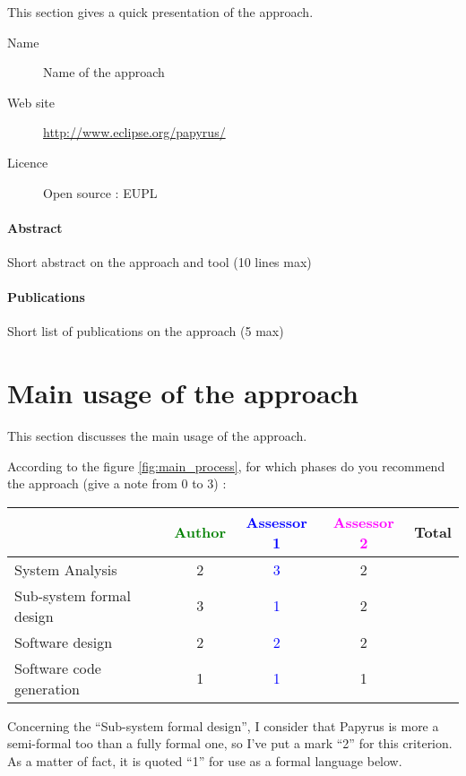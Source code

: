 This section gives a quick presentation of the approach.

\begin{description}
\item[Name] Name of the approach
\item[Web site] \url{http://www.eclipse.org/papyrus/}
\item[Licence] Open source : EUPL
\end{description}

\paragraph{Abstract} Short abstract on the approach and tool (10 lines max)

\paragraph{Publications} Short list of publications on the approach (5 max)


\section{Main usage of the approach}
\label{main_usage}
This section discusses the main usage of the approach.

According to the figure \ref{fig:main_process}, for which phases do you recommend the approach (give a note from 0 to 3) :

\begin{tabular}{|l | c | c | c | c|}
\hline
& \textcolor{green}{Author} & \textcolor{blue}{Assessor 1} & \textcolor{magenta}{Assessor 2} & Total \\
\hline
System Analysis & 2 & \textcolor{blue}{3} & 2 & \\
\hline
Sub-system formal design & 3 & \textcolor{blue}{1} & 2 & \\
\hline
Software design & 2 & \textcolor{blue}{2} & 2 & \\
\hline
Software code generation & 1 & \textcolor{blue}{1} & 1 & \\
\hline
\end{tabular}

\begin{assessor1}
Concerning the "`Sub-system formal design"', I consider that Papyrus is more a semi-formal too than a fully formal one, so I've put a mark "`2"' for this criterion. 
As a matter of fact, it is quoted "`1"' for use as a formal language below. 
\end{assessor1}

